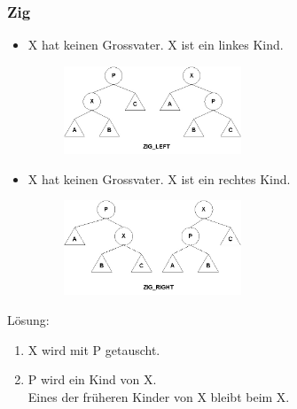 \documentclass[a4paper,10pt]{report}
\begin{document}
\subsubsection{Zig}
\begin{itemize}
	\item
		X hat keinen Grossvater. X ist ein linkes Kind.
		\begin{figure}[h]
			\begin{center}
  			\includegraphics[width=0.5\textwidth]{img/zigleft.jpg}
		\end{center}
	\end{figure}
	\item
		X hat keinen Grossvater. X ist ein rechtes Kind.
		\begin{figure}[h]
			\begin{center}
  			\includegraphics[width=0.5\textwidth]{img/zigright.jpg}
		\end{center}
	\end{figure}
\end{itemize}
Lösung:
\begin{enumerate}
	\item
		X wird mit P getauscht.
	\item
		P wird ein Kind von X. \\
		Eines der früheren Kinder von X bleibt beim X.
\end{enumerate}
\newpage
\end{document}
